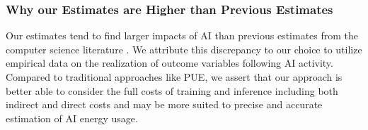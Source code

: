 \documentclass[a4paper,fleqn,longmktitle]{cas-sc}
\newcommand{\nb}[1]{\textcolor{blue}{NB[#1]}}
\theoremstyle{plain}
\theoremstyle{definition}
\begin{document}
\subsubsection{Why our Estimates are Higher than Previous Estimates}
Our estimates tend to find larger impacts of AI than previous estimates from the computer science literature \cite{strubell19, schwartz2020green}. We attribute this discrepancy to our choice to utilize empirical data on the realization of outcome variables following AI activity. Compared to traditional approaches like PUE, we assert that our approach is better able to consider the full costs of training and inference including both indirect and direct costs and may be more suited to precise and accurate estimation of AI energy usage.





\end{document}

